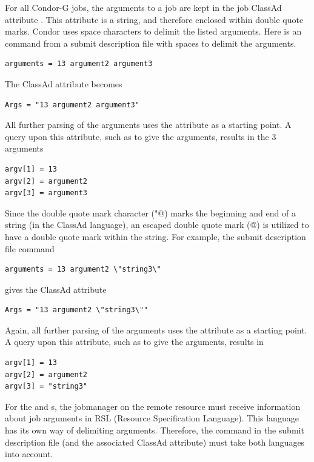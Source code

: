 For all Condor-G jobs,
the arguments to a job are kept in the job ClassAd attribute
.
This attribute is a string, and therefore enclosed within
double quote marks.
Condor uses space characters to delimit the listed
arguments.
Here is an  command from a submit
description file with spaces to delimit the arguments.
\footnotesize
\begin{verbatim}
arguments = 13 argument2 argument3
\end{verbatim}
\normalsize
The  ClassAd attribute becomes
\footnotesize
\begin{verbatim}
Args = "13 argument2 argument3"
\end{verbatim}
\normalsize
All further parsing of the arguments uses the 
attribute as a starting point.
A query upon this attribute, such as to give the arguments,
results in the 3 arguments
\begin{verbatim}
argv[1] = 13
argv[2] = argument2
argv[3] = argument3
\end{verbatim}

Since the double quote mark character (\verb@"@) marks the
beginning and end of a string (in the ClassAd language),
an escaped double quote mark (\verb@\"@) is utilized to have
a double quote mark within the string.
For example,
the submit description file  command
\footnotesize
\begin{verbatim}
arguments = 13 argument2 \"string3\"
\end{verbatim}
\normalsize
gives the ClassAd attribute
\footnotesize
\begin{verbatim}
Args = "13 argument2 \"string3\""
\end{verbatim}
\normalsize
Again, all further parsing of the arguments uses the 
attribute as a starting point.
A query upon this attribute, such as to give the arguments,
results in
\begin{verbatim}
argv[1] = 13
argv[2] = argument2
argv[3] = "string3"
\end{verbatim}

For the
 and  s,
the jobmanager on the remote resource
must receive information about job arguments
in RSL (Resource Specification Language).
This language has its own way of delimiting arguments.
Therefore, the  command in the
submit description file (and the associated ClassAd
attribute) must take both languages into account.

